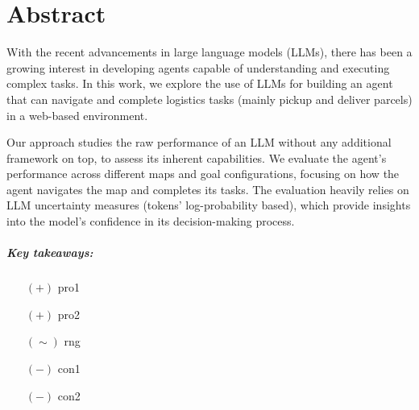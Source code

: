 \chapter*{Abstract}
\label{cha:abstract}

With the recent advancements in large language models (LLMs), there has been a growing
interest in developing agents capable of understanding and executing complex tasks.
In this work, we explore the use of LLMs for building an agent that can navigate
and complete logistics tasks (mainly pickup and deliver parcels) in a web-based environment.

Our approach studies the raw performance of an LLM without any additional framework
on top, to assess its inherent capabilities. We evaluate the agent's performance
across different maps and goal configurations, focusing on how the agent
navigates the map and completes its tasks. The evaluation heavily relies on LLM uncertainty
measures (tokens' log-probability based), which provide insights into the model's
confidence in its decision-making process.

\paragraph{Key takeaways:}
\begin{itemize}
  \item[$(+)$] pro1

  \item[$(+)$] pro2

  \item[$(\sim)$] rng

  \item[$(-)$] con1

  \item[$(-)$] con2
\end{itemize}